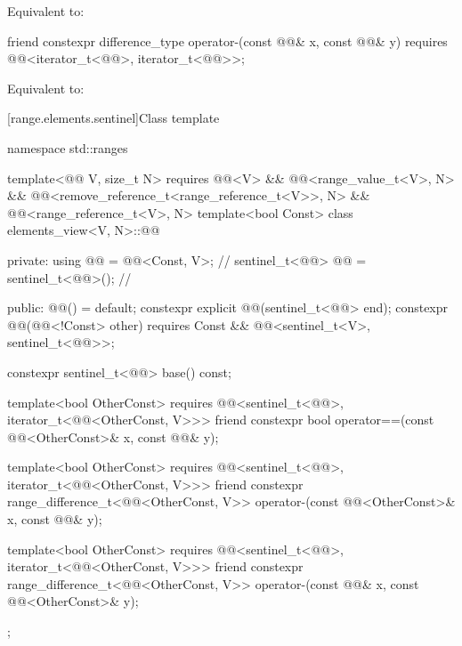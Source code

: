 \begin{itemdescr}
\pnum
\effects
Equivalent to: 
\end{itemdescr}

%
\begin{itemdecl}
friend constexpr difference_type operator-(const @@& x, const @@& y)
  requires @@<iterator_t<@@>, iterator_t<@@>>;
\end{itemdecl}

\begin{itemdescr}
\pnum
\effects
Equivalent to: 
\end{itemdescr}

[range.elements.sentinel]{Class template }

\begin{codeblock}
namespace std::ranges {
  template<@@ V, size_t N>
    requires @@<V> && @@<range_value_t<V>, N> &&
             @@<remove_reference_t<range_reference_t<V>>, N> &&
             @@<range_reference_t<V>, N>
  template<bool Const>
  class elements_view<V, N>::@@ {
  private:
    using @@ = @@<Const, V>;                 // \expos
    sentinel_t<@@> @@ = sentinel_t<@@>();         // \expos

  public:
    @@() = default;
    constexpr explicit @@(sentinel_t<@@> end);
    constexpr @@(@@<!Const> other)
      requires Const && @@<sentinel_t<V>, sentinel_t<@@>>;

    constexpr sentinel_t<@@> base() const;

    template<bool OtherConst>
      requires @@<sentinel_t<@@>, iterator_t<@@<OtherConst, V>>>
    friend constexpr bool operator==(const @@<OtherConst>& x, const @@& y);

    template<bool OtherConst>
      requires @@<sentinel_t<@@>, iterator_t<@@<OtherConst, V>>>
    friend constexpr range_difference_t<@@<OtherConst, V>>
      operator-(const @@<OtherConst>& x, const @@& y);

    template<bool OtherConst>
      requires @@<sentinel_t<@@>, iterator_t<@@<OtherConst, V>>>
    friend constexpr range_difference_t<@@<OtherConst, V>>
      operator-(const @@& x, const @@<OtherConst>& y);
  };
}
\end{codeblock}

